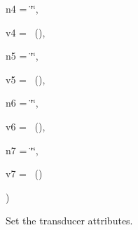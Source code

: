 {\begin{DoxyParamCaption}
\item[{std\+::string}]{n4 = {\ttfamily \char`\"{}\char`\"{}}, }
\item[{const {\bf Attribute\+Value} \&}]{v4 = {~()}, }
\item[{std\+::string}]{n5 = {\ttfamily \char`\"{}\char`\"{}}, }
\item[{const {\bf Attribute\+Value} \&}]{v5 = {~()}, }
\item[{std\+::string}]{n6 = {\ttfamily \char`\"{}\char`\"{}}, }
\item[{const {\bf Attribute\+Value} \&}]{v6 = {~()}, }
\item[{std\+::string}]{n7 = {\ttfamily \char`\"{}\char`\"{}}, }
\item[{const {\bf Attribute\+Value} \&}]{v7 = {~()}}
\end{DoxyParamCaption}
)}\hypertarget{classns3_1_1UanHelper_ad94f28eb4888f113c762f44a4c55caf4}{}\label{classns3_1_1UanHelper_ad94f28eb4888f113c762f44a4c55caf4}
Set the transducer attributes.


